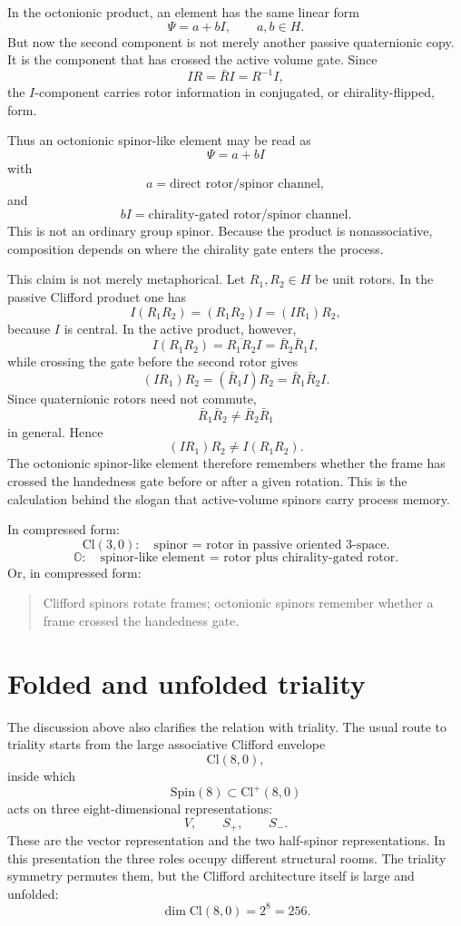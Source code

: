 \documentclass[11pt]{article}
\newcommand{\Cl}{\mathrm{Cl}}
\newcommand{\OO}{\mathbb O}
\begin{document}
In the octonionic product, an element has the same linear form
\[
\Psi=a+bI,
\qquad a,b\in H.
\]
But now the second component is not merely another passive quaternionic copy.
It is the component that has crossed the active volume gate. Since
\[
IR=\bar R I=R^{-1}I,
\]
the $I$-component carries rotor information in conjugated, or chirality-flipped,
form.

Thus an octonionic spinor-like element may be read as
\[
\Psi=a+bI
\]
with
\[
a=\text{direct rotor/spinor channel},
\]
and
\[
bI=\text{chirality-gated rotor/spinor channel}.
\]
This is not an ordinary group spinor. Because the product is nonassociative,
composition depends on where the chirality gate enters the process.

This claim is not merely metaphorical. Let $R_1,R_2\in H$ be unit rotors. In
the passive Clifford product one has
\[
I(R_1R_2)=(R_1R_2)I=(IR_1)R_2,
\]
because $I$ is central. In the active product, however,
\[
I(R_1R_2)=\overline{R_1R_2}I=\bar R_2\bar R_1 I,
\]
while crossing the gate before the second rotor gives
\[
(IR_1)R_2=(\bar R_1I)R_2=\bar R_1\bar R_2I.
\]
Since quaternionic rotors need not commute,
\[
\bar R_1\bar R_2\neq \bar R_2\bar R_1
\]
in general. Hence
\[
(IR_1)R_2\neq I(R_1R_2).
\]
The octonionic spinor-like element therefore remembers whether the frame has
crossed the handedness gate before or after a given rotation. This is the
calculation behind the slogan that active-volume spinors carry process memory.

In compressed form:
\[
\boxed{
\Cl(3,0):\quad \text{spinor = rotor in passive oriented 3-space.}
}
\]
\[
\boxed{
\OO:\quad \text{spinor-like element = rotor plus chirality-gated rotor.}
}
\]
Or, in compressed form:
\begin{quote}
Clifford spinors rotate frames; octonionic spinors remember whether a frame
crossed the handedness gate.
\end{quote}



\section{Folded and unfolded triality}

The discussion above also clarifies the relation with triality. The usual
route to triality starts from the large associative Clifford envelope
\[
\Cl(8,0),
\]
inside which
\[
\mathrm{Spin}(8)\subset \Cl^+(8,0)
\]
acts on three eight-dimensional representations:
\[
V,
\qquad
S_+,
\qquad
S_-.
\]
These are the vector representation and the two half-spinor representations.
In this presentation the three roles occupy different structural rooms. The
triality symmetry permutes them, but the Clifford architecture itself is large
and unfolded:
\[
\dim \Cl(8,0)=2^8=256.
\]
\end{document}
